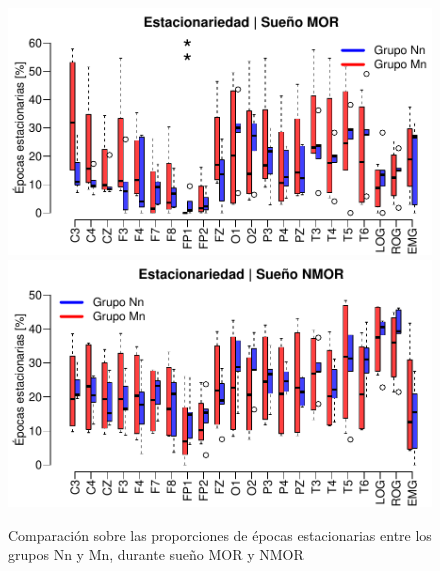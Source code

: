 \begin{figure}
\centering
\includegraphics[width=\linewidth]
{./img_ejemplos/Comparacion_gpos_MOR_v2.pdf} \\
\includegraphics[width=\linewidth]
{./img_ejemplos/Comparacion_gpos_NMOR_v2.pdf}
\caption{Comparación sobre las proporciones de épocas estacionarias entre los grupos Nn y Mn, 
durante sueño MOR y NMOR}
\label{comparacion_graf}
\end{figure}



